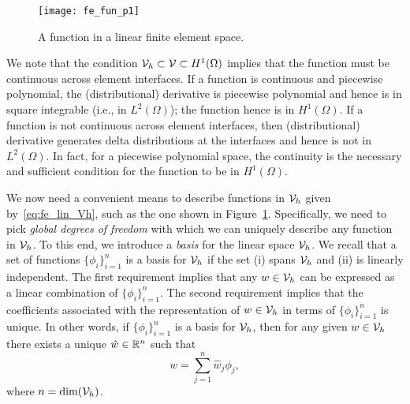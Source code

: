 \begin{figure}
  \centering
  \texttt{[image: fe\_fun\_p1]}
  \caption{A function in a linear finite element space.}
  \label{fig:fe_fun_p1}
\end{figure}

We note that the condition $\mathcal{V}_h \subset \mathcal{V} \subset H^1(\Omega)$ implies that the function must be continuous across element interfaces.  If a function is continuous and piecewise polynomial, the (distributional) derivative is piecewise polynomial and hence is in square integrable (i.e., in $L^2(\Omega)$); the function hence is in $H^1(\Omega)$.  If a function is not continuous across element interfaces, then (distributional) derivative generates delta distributions at the interfaces and hence is not in $L^2(\Omega)$. In fact, for a piecewise polynomial space, the continuity is the necessary and sufficient condition for the function to be in $H^1(\Omega)$. 

We now need a convenient means to describe functions in $\mathcal{V}_h$ given by~\eqref{eq:fe_lin_Vh}, such as the one shown in Figure~\ref{fig:fe_fun_p1}.  Specifically, we need to pick \emph{global degrees of freedom} with which we can uniquely describe any function in $\mathcal{V}_h$. To this end, we introduce a \emph{basis} for the linear space $\mathcal{V}_h$.  We recall that a set of functions $\{ \phi_i \}_{i=1}^n$ is a basis for $\mathcal{V}_h$ if the set (i) spans $\mathcal{V}_h$ and (ii) is linearly independent. The first requirement implies that any $w \in \mathcal{V}_h$ can be expressed as a linear combination of $\{ \phi_i \}_{i=1}^n$.  The second requirement implies that the coefficients associated with the representation of $w \in \mathcal{V}_h$ in terms of $\{ \phi_i \}_{i=1}^n$ is unique.  In other words, if $\{ \phi_i \}_{i=1}^n$ is a basis for $\mathcal{V}_h$, then for any given $w \in \mathcal{V}_h$ there exists a unique $\hat w \in \mathbb{R}^n$ such that
\begin{equation*}
  w = \sum_{j=1}^n \hat w_j \phi_j,
\end{equation*}
where $n = \text{dim}(\mathcal{V}_h)$.

